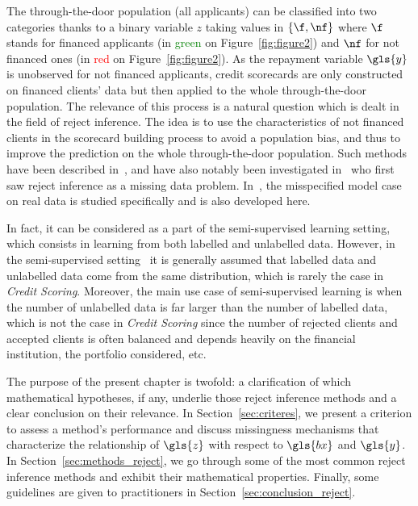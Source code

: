 The through-the-door population (all applicants) can be classified into two categories thanks to a binary variable $z$ taking values in $\{\f,\nf\}$ where $\f$ stands for financed applicants (in \textcolor{green}{green} on Figure~\ref{fig:figure2}) and $\nf$ for not financed ones (in \textcolor{red}{red} on Figure~\ref{fig:figure2}). As the repayment variable $\gls{y}$ is unobserved for not financed applicants, credit scorecards are only constructed on financed clients' data but then applied to the whole  through-the-door population. The relevance of this process is a natural question which is dealt in the field of {reject inference}. The idea is to use the characteristics of not financed clients in the scorecard building process to avoid a population bias, and thus to improve the prediction on the whole through-the-door population. Such methods have been described in~\cite{RI6,saporta,banasik,economix}, and have also notably been investigated in~\cite{RI2} who first saw {reject inference} as a missing data problem. In~\cite{RI3}, the misspecified model case on real data is studied specifically and is also developed here.


In fact, it can be considered as a part of the semi-supervised learning setting, which consists in learning from both labelled and unlabelled data. However, in the semi-supervised setting~\cite{ChaSchZie06} it is generally assumed that labelled data and unlabelled data come from the same distribution, which is rarely the case in \textit{Credit Scoring}. Moreover, the main use case of semi-supervised learning is when the number of unlabelled data is far larger than the number of labelled data, which is not the case in \textit{Credit Scoring} since the number of rejected clients and accepted clients is often balanced and depends heavily on the financial institution, the portfolio considered, etc.


The purpose of the present chapter is twofold: a clarification of which mathematical hypotheses, if any, underlie those reject inference methods and a clear conclusion on their relevance. In Section~\ref{sec:criteres}, we present a criterion to assess a method's performance and discuss missingness mechanisms that characterize the relationship of $\gls{z}$ with respect to $\gls{bx}$ and $\gls{y}$. In Section~\ref{sec:methods_reject}, we go through some of the most common reject inference methods and exhibit their mathematical properties. 
Finally, some guidelines are given to practitioners in Section~\ref{sec:conclusion_reject}.

